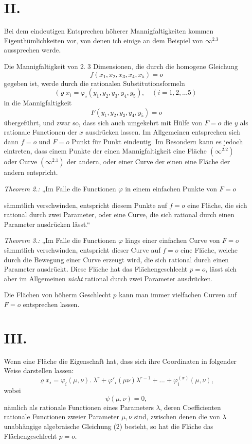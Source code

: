 \documentclass{article}
\begin{document}
\section*{II.}

Bei dem eindeutigen Entsprechen höherer Mannigfaltigkeiten kommen Eigenthümlichkeiten vor, von denen ich einige an dem Beispiel von $\infty^{2.3}$ aussprechen werde.

Die Mannigfaltigkeit von $2.\;3$ Dimensionen, die durch die homogene Gleichung
\[ f(x_1, x_2, x_3, x_4, x_5) = o \]
gegeben ist, werde durch die rationalen Substitutionsformeln
\[ (\varrho x_i = \varphi_i(y_1, y_2, y_3, y_4, y_5), \quad (i = 1, 2, \ldots 5) \]
in die Mannigfaltigkeit
\[ F(y_1, y_2, y_3, y_4, y_5) = o \]
übergeführt, und zwar so, dass sich auch umgekehrt mit Hülfe von $F = o$ die $y$ als rationale Functionen der $x$ ausdrücken lassen. Im Allgemeinen entsprechen sich dann $f = o$ und $F = o$ Punkt für Punkt eindeutig. Im Besondern kann es jedoch eintreten, dass einem Punkte der einen Mannigfaltigkeit eine Fläche $(\infty^{2.2})$ oder Curve $(\infty^{2.1})$ der andern, oder einer Curve der einen eine Fläche der andern entspricht.

\emph{Theorem 2.:} „Im Falle die Functionen $\varphi$ in einem einfachen Punkte von $F = o$

sämmtlich verschwinden, entspricht diesem Punkte auf $f = o$ eine Fläche, die sich rational durch zwei Parameter, oder eine Curve, die sich rational durch einen Parameter ausdrücken lässt.“

\emph{Theorem 3.:} „Im Falle die Functionen $\varphi$ längs einer einfachen Curve von $F = o$ sämmtlich verschwinden, entspricht dieser Curve auf $f = o$ eine Fläche, welche durch die Bewegung einer Curve erzeugt wird, die sich rational durch einen Parameter ausdrückt. Diese Fläche hat das Flächengeschlecht $p = o$, lässt sich aber im Allgemeinen \emph{nicht} rational durch zwei Parameter ausdrücken.

Die Flächen von höherm Geschlecht $p$ kann man immer vielfachen Curven auf $F = o$ entsprechen lassen.

\section*{III.}

Wenn eine Fläche die Eigenschaft hat, dass sich ihre Coordinaten in folgender Weise darstellen lassen:
\[ \varrho x_i = \varphi_i(\mu,\nu).\; \lambda^{r} + \varphi'_i(\mu\nu) \lambda^{r-1} + \ldots + \varphi_i^{(\sigma)}(\mu,\nu), \tag{1} \]
wobei
\[ \psi(\mu,\nu) = 0, \tag{2} \]
nämlich als rationale Functionen eines Parameters $\lambda$, deren Coefficienten rationale Functionen zweier Parameter $\mu, \nu$ sind, zwischen denen die von $\lambda$ unabhängige algebraische Gleichung (2) besteht, so hat die Fläche das Flächengeschlecht $p = o$.
\end{document}
